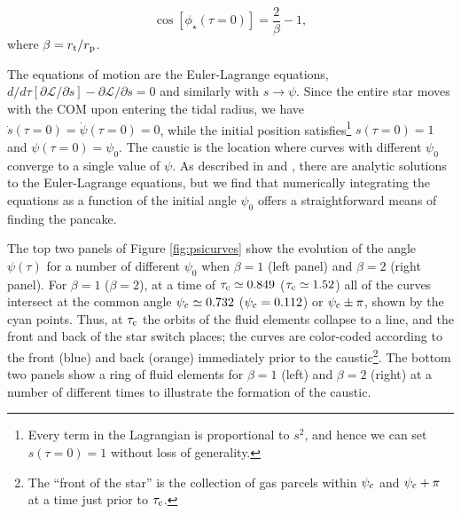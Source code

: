\documentclass[twocolumn]{aastex62}
\begin{document}
\begin{equation}
\cos\left[\phi_{\star}(\tau = 0)\right] = \frac{2}{\beta}-1,
\end{equation}
where $\beta = r_{\rm t}/r_{\rm p}$. 

The equations of motion are the Euler-Lagrange equations, $d/d\tau\left[\partial \mathscr{L}/\partial \dot{s}\right]-\partial\mathscr{L}/\partial s = 0$ and similarly with $s \rightarrow \psi$. Since the entire star moves with the COM upon entering the tidal radius, we have $\dot{s}(\tau = 0) = \dot{\psi}(\tau = 0) = 0$, while the initial position satisfies\footnote{Every term in the Lagrangian is proportional to $s^2$, and hence we can set $s(\tau = 0) = 1$ without loss of generality.} $s(\tau = 0) = 1$ and $\psi(\tau = 0) = \psi_{0}$. The caustic is the location where curves with different $\psi_0$ converge to a single value of $\psi$. As described in \citet{sari10} and \citet{stone13}, there are analytic solutions to the Euler-Lagrange equations, but we find that numerically integrating the equations as a function of the initial angle $\psi_{0}$ offers a straightforward means of finding the pancake.

The top two panels of Figure \ref{fig:psicurves} show the evolution of the angle $\psi(\tau)$ for a number of different $\psi_{0}$ when $\beta = 1$ (left panel) and $\beta = 2$ (right panel). For $\beta = 1$ ($\beta = 2$), at a time of $\tau_{\rm c} \simeq 0.849$ ($\tau_{\rm c} \simeq 1.52$) all of the curves intersect at the common angle $\psi_{\rm c} \simeq 0.732$ ($\psi_{\rm c} = 0.112$) or $\psi_{\rm c}\pm \pi$, shown by the cyan points. Thus, at $\tau_{\rm c}$ the orbits of the fluid elements collapse to a line, and the front and back of the star switch places; the curves are color-coded according to the front (blue) and back (orange) immediately prior to the caustic\footnote{The ``front of the star'' is the collection of gas parcels within $\psi_{\rm c}$ and $\psi_{\rm c}+\pi$ at a time just prior to $\tau_{\rm c}$.}. The bottom two panels show a ring of fluid elements for $\beta = 1$ (left) and $\beta = 2$ (right) at a number of different times to illustrate the formation of the caustic. 
\end{document}
